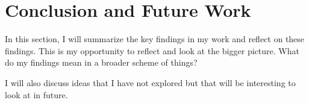 \section{Conclusion and Future Work}
\label{sec:conclusion}

In this section, I will summarize the key findings in 
my work and reflect on these findings. 
This is my opportunity to reflect and look at the bigger
picture. What do my findings mean in a broader scheme of 
things?

I will also discuss ideas that I have not explored but 
that will be interesting to look at in future. 


